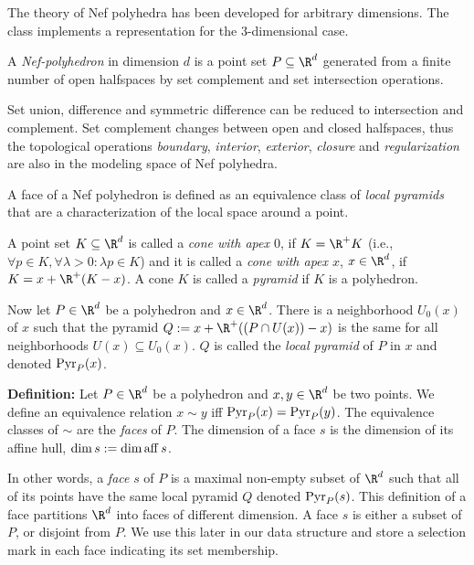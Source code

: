 The theory of Nef polyhedra has been developed for arbitrary
dimensions. The class  implements a
representation for the 3-dimensional case.


\vspace{2ex}{\bf Definition:}\quad
    A \emph{Nef-poly\-he\-dron} in dimension $d$ is a point set $P \subseteq
    \R^d$ generated from a finite number of open halfspaces by set
    complement and set intersection operations.
\vspace{2ex}

Set union, difference and symmetric difference can be reduced to
intersection and complement. Set complement changes between open
and closed halfspaces, thus the topological operations \emph{boundary},
\emph{interior}, \emph{exterior}, \emph{closure} and {\em
regularization} are also in the modeling space of Nef polyhedra.

A face of a Nef polyhedron is defined as an equivalence class of
\emph{local pyramids} that are a characterization of the local space
around a point.

\vspace{2ex}{\bf Definition:}\quad
    A point set $K \subseteq \R^d$ is called a \emph{cone with apex $0$},
    if $K = \R^{+} K$ (i.e., $\forall p \in K, \forall \lambda > 0: \lambda p
    \in K$) and it is called a \emph{cone with apex $x$}, $x \in \R^d$,
    if $K = x + \R^{+} (K - x)$. A cone $K$ is called a \emph{pyramid}
    if $K$ is a polyhedron.

    Now let $P \in \R^d$ be a polyhedron and $x \in \R^d$. There is a 
    neighborhood $U_0(x)$ of $x$ such that the pyramid $Q := x + \R^{+} 
    ((P \cap U(x)) - x)$ is the same for all neighborhoods $U(x) \subseteq
    U_0(x)$. $Q$ is called the \emph{local pyramid} of $P$ in $x$ and
    denoted $\pyr_P(x)$. 
\vspace{2ex}

{\bf Definition:}\quad
    Let $P \in \R^d$ be a polyhedron and $x, y \in \R^d$ be two points.
    We define an equivalence relation $x \sim y$ iff
    $\pyr_P(x) = \pyr_P(y)$. The equivalence classes of $\sim$ 
    are the \emph{faces} of $P$. The dimension of a face $s$ is the  
    dimension of its affine hull, $\dim s := \dim \aff s$.
\vspace{2ex}

In other words, a \emph{face} $s$ of $P$ is a maximal non-empty subset
of $\R^d$ such that all of its points have the same local pyramid $Q$
denoted $\pyr_P(s)$.  This definition of a face partitions $\R^d$ into
faces of different dimension. A face $s$ is either a subset of $P$, or
disjoint from $P$.  We use this later in our data structure and store
a selection mark in each face indicating its set membership.

